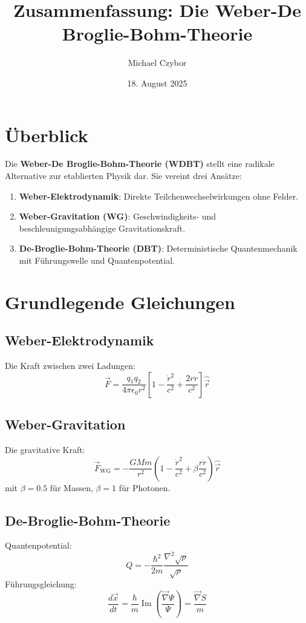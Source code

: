 \documentclass[11pt, a4paper]{article}
\title{Zusammenfassung: Die Weber-De Broglie-Bohm-Theorie}
\author{Michael Czybor}
\date{18. August 2025}
\begin{document}
\maketitle

\section*{Überblick}
Die \textbf{Weber-De Broglie-Bohm-Theorie (WDBT)} stellt eine radikale Alternative zur etablierten Physik dar. Sie vereint drei Ansätze:
\begin{enumerate}
    \item \textbf{Weber-Elektrodynamik}: Direkte Teilchenwechselwirkungen ohne Felder.
    \item \textbf{Weber-Gravitation (WG)}: Geschwindigkeits- und beschleunigungsabhängige Gravitationskraft.
    \item \textbf{De-Broglie-Bohm-Theorie (DBT)}: Deterministische Quantenmechanik mit Führungswelle und Quantenpotential.
\end{enumerate}

\section*{Grundlegende Gleichungen}

\subsection*{Weber-Elektrodynamik}
Die Kraft zwischen zwei Ladungen:
\[
\vec{F} = \frac{q_1 q_2}{4\pi\epsilon_0 r^2} \left[ 1 - \frac{\dot{r}^2}{c^2} + \frac{2r\ddot{r}}{c^2} \right] \hat{\vec{r}}
\]

\subsection*{Weber-Gravitation}
Die gravitative Kraft:
\[
\vec{F}_{\text{WG}} = -\frac{GMm}{r^2} \left( 1 - \frac{\dot{r}^2}{c^2} + \beta \frac{r\ddot{r}}{c^2} \right) \hat{\vec{r}}
\]
mit \(\beta = 0.5\) für Massen, \(\beta = 1\) für Photonen.

\subsection*{De-Broglie-Bohm-Theorie}
Quantenpotential:
\[
Q = -\frac{\hbar^2}{2m} \frac{\nabla^2 \sqrt{\rho}}{\sqrt{\rho}}
\]
Führungsgleichung:
\[
\frac{d\vec{x}}{dt} = \frac{\hbar}{m} \operatorname{Im} \left( \frac{\vec{\nabla} \Psi}{\Psi} \right) = \frac{\vec{\nabla} S}{m}
\]
\end{document}
